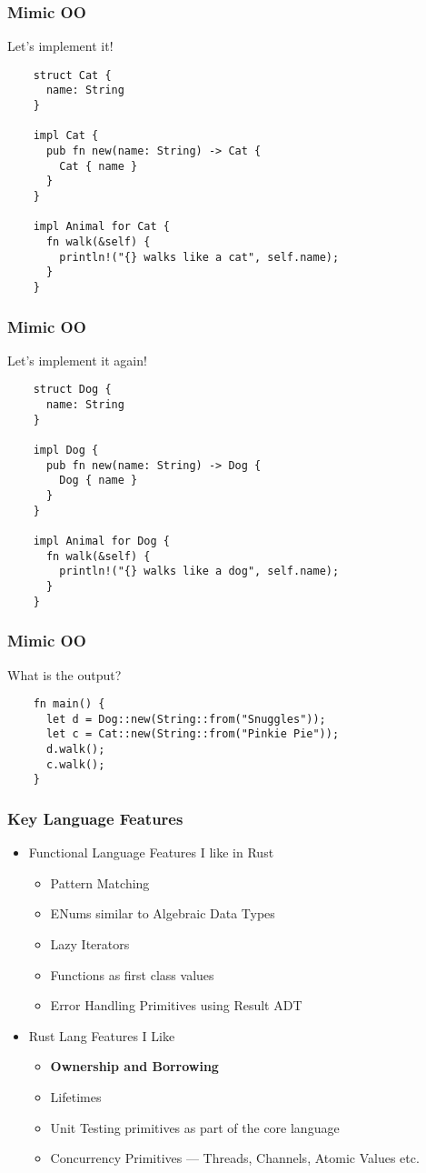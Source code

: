 \begin{frame}[fragile]
  \frametitle{Mimic OO}
  Let's implement it! \break{}
  \begin{verbatim}
    struct Cat {
      name: String
    }

    impl Cat {
      pub fn new(name: String) -> Cat {
        Cat { name }
      }
    }

    impl Animal for Cat {
      fn walk(&self) {
        println!("{} walks like a cat", self.name);
      }
    }
  \end{verbatim}
\end{frame}

\begin{frame}[fragile]
  \frametitle{Mimic OO}
  Let's implement it again! \break{}
  \begin{verbatim}
    struct Dog {
      name: String
    }

    impl Dog {
      pub fn new(name: String) -> Dog {
        Dog { name }
      }
    }

    impl Animal for Dog {
      fn walk(&self) {
        println!("{} walks like a dog", self.name);
      }
    }
  \end{verbatim}
\end{frame}

\begin{frame}[fragile]
  \frametitle{Mimic OO}
  What is the output? \break{}
  \begin{verbatim}
    fn main() {
      let d = Dog::new(String::from("Snuggles"));
      let c = Cat::new(String::from("Pinkie Pie"));
      d.walk();
      c.walk();
    }
  \end{verbatim}
\end{frame}

\begin{frame}
  \frametitle{Key Language Features}
  \begin{itemize}
  \item Functional Language Features I like in Rust
    \begin{itemize}
    \item Pattern Matching
    \item ENums similar to Algebraic Data Types
    \item Lazy Iterators
    \item Functions as first class values
    \item Error Handling Primitives using Result ADT
    \end{itemize}
  \item Rust Lang Features I Like
    \begin{itemize}
    \item \textbf{Ownership and Borrowing}
    \item Lifetimes
    \item Unit Testing primitives as part of the core language
    \item Concurrency Primitives --- Threads, Channels, Atomic Values etc.
    \end{itemize}
  \end{itemize}
\end{frame}
